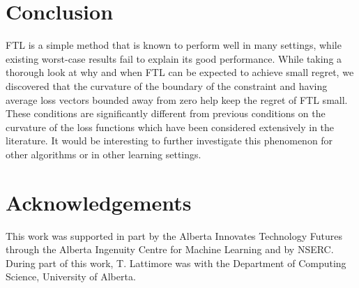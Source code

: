 \documentclass[english]{article}
\newcommand{\cA}{\mathcal{A}}
\newcommand{\cB}{\mathcal{B}}
\begin{document}
\section{Conclusion}
FTL is a simple method that is known to perform well in many settings, while 
existing worst-case results fail to explain its good performance.
While taking a thorough look at why and when FTL can be expected to achieve small regret, we discovered that the curvature of the boundary of the constraint and having average loss vectors bounded away from zero help keep the regret of FTL small. These conditions are significantly different from previous conditions on the curvature of the loss functions which have been considered extensively in the literature.
It would be interesting to further investigate this phenomenon for other algorithms or in other learning settings.

\section*{Acknowledgements}
This work was supported in part by the Alberta Innovates Technology Futures through the Alberta Ingenuity Centre for Machine Learning and by NSERC.
During part of this work, T. Lattimore was with the Department of Computing Science, University of Alberta.

\small
\setlength{\bibsep}{0.4\bibsep}




\end{document}
